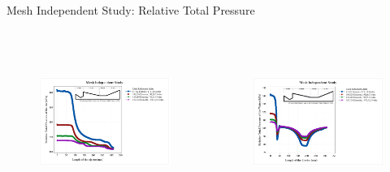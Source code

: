\begin{frame}{Mesh Independent Study: Relative Total Pressure}
       \begin{columns}
      \begin{figure}[h]
      \centering
      \includegraphics[height=4.5cm]{images/MISRelTPAir.png}
      \label{fig:meshindependentstudy}
      \end{figure}
      \begin{figure}[h]
      \centering
      \includegraphics[height=4.5cm]{images/MISRelTPwater.png}
      \label{fig:meshindependentstudy}
      \end{figure}
    \end{columns}
\end{frame}

